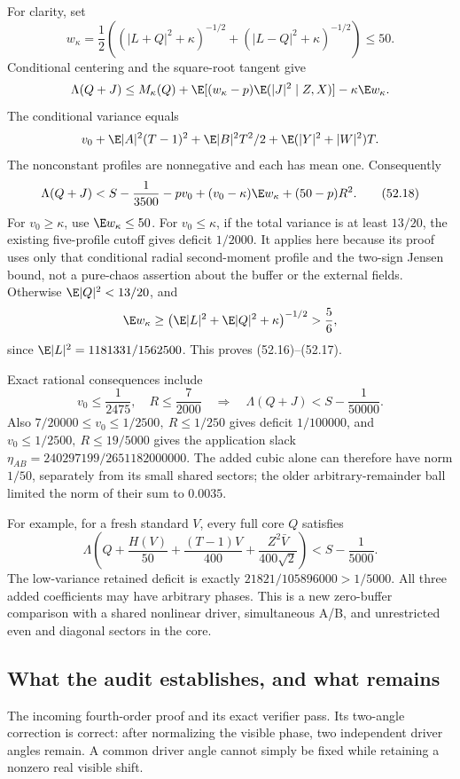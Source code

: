For clarity, set
\[
 w_\kappa=\frac12\left((|L+Q|^2+\kappa)^{-1/2}
                      +(|L-Q|^2+\kappa)^{-1/2}\right)\le50.
\]
Conditional centering and the square-root tangent give
\[
 \Lambda(Q+J)\le M_\kappa(Q)+
    \E[(w_\kappa-p)\E(|J|^2\mid Z,X)]-\kappa\E w_\kappa.
\]
The conditional variance equals
\[
 v_0+\E|A|^2(T-1)^2+\E|B|^2T^2/2+
                \E(|Y|^2+|W|^2)T.
\]
The nonconstant profiles are nonnegative and each has mean one.
Consequently
\[
 \Lambda(Q+J)<S-\frac1{3500}-pv_0+
                  (v_0-\kappa)\E w_\kappa+(50-p)R^2.
 \tag{52.18}
\]
For \(v_0\ge\kappa\), use \(\E w_\kappa\le50\).
For \(v_0\le\kappa\), if the total variance is at least \(13/20\),
the existing five-profile cutoff gives deficit \(1/2000\).
It applies here because its proof uses only that conditional radial
second-moment profile and the two-sign Jensen bound, not a
pure-chaos assertion about the buffer or the external fields.
Otherwise \(\E|Q|^2<13/20\), and
\[
 \E w_\kappa\ge
 \left(\E|L|^2+\E|Q|^2+\kappa\right)^{-1/2}>\frac56,
\]
since \(\E|L|^2=1181331/1562500\).
This proves (52.16)--(52.17).

Exact rational consequences include
\[
 \boxed{v_0\le\frac1{2475},\quad R\le\frac7{2000}
 \quad\Longrightarrow\quad\Lambda(Q+J)<S-\frac1{50000}.}
 \tag{52.19}
\]
Also \(7/20000\le v_0\le1/2500,\ R\le1/250\) gives deficit
\(1/100000\), and \(v_0\le1/2500,\ R\le19/5000\) gives
the application slack \(\eta_{AB}=240297199/2651182000000\).
The added cubic alone can therefore have norm \(1/50\), separately
from its small shared sectors; the older arbitrary-remainder ball
limited the norm of their sum to \(0.0035\).

For example, for a fresh standard \(V\), every full core \(Q\) satisfies
\[
 \boxed{\Lambda\left(Q+\frac{H(V)}{50}
    +\frac{(T-1)V}{400}+\frac{Z^2\bar V}{400\sqrt2}\right)
       <S-\frac1{5000}.}
 \tag{52.20}
\]
The low-variance retained deficit is exactly
\(21821/105896000>1/5000\).
All three added coefficients may have arbitrary phases.
This is a new zero-buffer comparison with a shared nonlinear driver,
simultaneous A/B, and unrestricted even and diagonal sectors in the core.

\subsection{What the audit establishes, and what remains}
The incoming fourth-order proof and its exact verifier pass.
Its two-angle correction is correct: after normalizing the visible
phase, two independent driver angles remain. A common driver angle
cannot simply be fixed while retaining a nonzero real visible shift.


